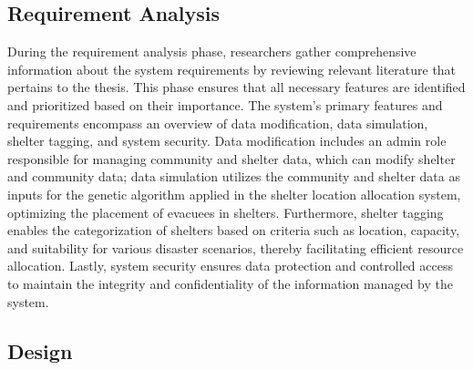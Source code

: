 \subsection{Requirement Analysis}

During the requirement analysis phase, researchers gather comprehensive information about the system requirements by reviewing relevant literature that pertains to the thesis. This phase ensures that all necessary features are identified and prioritized based on their importance.
The system's primary features and requirements encompass an overview of data modification, data simulation, shelter tagging, and system security. Data modification includes an admin role responsible for managing community and shelter data, which can modify shelter and community data; data simulation utilizes the community and shelter data as inputs for the genetic algorithm applied in the shelter location allocation system, optimizing the placement of evacuees in shelters. Furthermore, shelter tagging enables the categorization of shelters based on criteria such as location, capacity, and suitability for various disaster scenarios, thereby facilitating efficient resource allocation. Lastly, system security ensures data protection and controlled access to maintain the integrity and confidentiality of the information managed by the system.

\subsection{Design}

